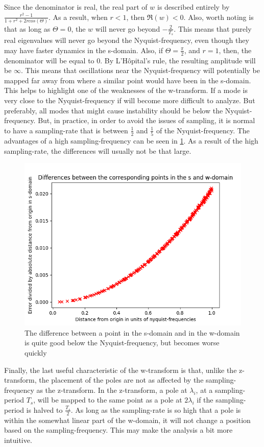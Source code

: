 Since the denominator is real, the real part of $w$ is described entirely by $\frac{r^2-1}{1+r^2 + 2 r cos (\Theta)}$. As a result, when $r<1$, then $\Re{(w)} < 0$. Also, worth noting is that as long as $\Theta =0$, the $w$ will never go beyond $-\frac{2}{T_s}$. This means that purely real eigenvalues will never go beyond the Nyquist-frequency, even though they may have faster dynamics in the s-domain. Also, if $\Theta =\frac{\pi}{2}$, and $r=1$, then, the denominator will be equal to 0. By L'Hôpital's rule, the resulting amplitude will be $\infty$. This means that oscillations near the Nyquist-frequency will potentially be mapped far away from where a similar point would have been in the s-domain. This helps to highlight one of the weaknesses of the w-transform. If a mode is very close to the Nyquist-frequency if will become more difficult to analyze. But preferably, all modes that might cause instability should be below the Nyquist-frequency. But, in practice, in order to avoid the issues of sampling, it is normal to have a sampling-rate that is between $\frac{1}{2}$ and $\frac{1}{5}$ of the Nyquist-frequency. The advantages of a high sampling-frequency can be seen in \cref{fig:dif_s_and_w}. As a result of the high sampling-rate, the differences will usually not be that large.


\begin{figure}
 \centering
 \includegraphics{Figures/differences_in_well_behaved_region.png}
 \caption{The difference between a point in the s-domain and in the w-domain is quite good below the Nyquist-frequency, but becomes worse quickly}
 \label{fig:dif_s_and_w}
\end{figure}
\noindent

Finally, the last useful characteristic of the w-transform is that, unlike the z-transform, the placement of the poles are not as affected by the sampling-frequency as the z-transform. In the z-transform, a pole at $\lambda_i$, at a sampling-period $T_s$, will be mapped to the same point as a pole at $2\lambda_i$ if the sampling-period is halved to $\frac{T_s}{2}$. As long as the sampling-rate is so high that a pole is within the somewhat linear part of the w-domain, it will not change a position based on the sampling-frequency. This may make the analysis a bit more intuitive. 